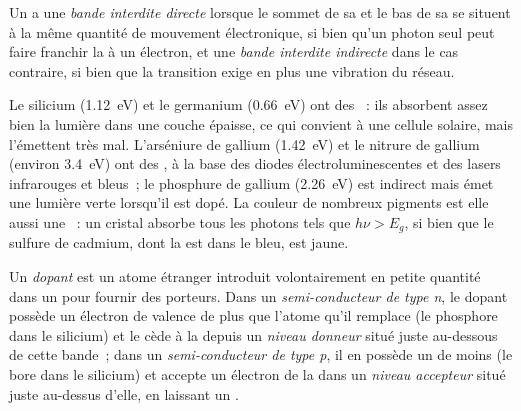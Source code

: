 \begin{definition}\label{def:b3:solid-state:gap-types}
Un  a une \emph{bande interdite directe} lorsque
le sommet de sa  et le bas de sa  se
situent à la même quantité de mouvement électronique, si bien qu'un photon
seul peut faire franchir la  à un électron, et une
\emph{bande interdite indirecte} dans le cas contraire, si bien que la
transition exige en plus une vibration du réseau.
\end{definition}

Le silicium (\qty{1.12}{eV}) et le germanium (\qty{0.66}{eV}) ont des
~: ils absorbent assez bien la lumière dans une
couche épaisse, ce qui convient à une cellule solaire, mais l'émettent très
mal. L'arséniure de gallium (\qty{1.42}{eV}) et le nitrure de gallium
(environ \qty{3.4}{eV}) ont des , à la base des
diodes électroluminescentes et des lasers infrarouges et bleus~; le
phosphure de gallium (\qty{2.26}{eV}) est indirect mais émet une lumière
verte lorsqu'il est dopé. La couleur de nombreux pigments est elle aussi
une ~: un cristal absorbe tous les photons tels que $h\nu > E_g$, si bien que le sulfure de cadmium, dont la  est dans le bleu,
est jaune.

\begin{definition}[Dopage]\label{def:b3:solid-state:doping}
Un \emph{dopant} est un atome étranger introduit
volontairement en petite quantité dans un  pour fournir des
porteurs. Dans un \emph{semi-conducteur de type n}, le dopant
possède un électron de valence de plus que l'atome qu'il remplace (le
phosphore dans le silicium) et le cède à la  depuis un
\emph{niveau donneur} situé juste au-dessous de
cette bande~; dans un \emph{semi-conducteur de type p}, il en possède
un de moins (le bore dans le silicium) et accepte un électron de la  dans un \emph{niveau accepteur} situé
juste au-dessus d'elle, en laissant un .
\end{definition}

